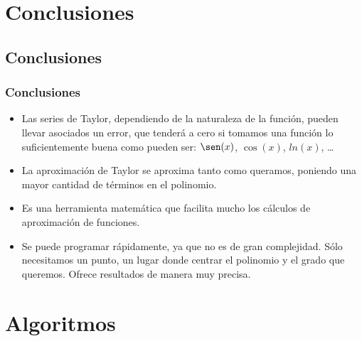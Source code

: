\documentclass{beamer}
\begin{document}
\section{Conclusiones}
\subsection{Conclusiones}
\begin{frame}
\frametitle{Conclusiones}

\begin{itemize}

 \item Las series de Taylor, dependiendo de la naturaleza de la función, pueden llevar asociados un error, que tenderá a cero si tomamos una
 función lo suficientemente buena como pueden ser: $\sen(x)$, $\cos(x)$, $ln(x)$, \ldots
 \item La aproximación de Taylor se aproxima tanto como queramos, poniendo una mayor cantidad de términos en el polinomio.
 \item Es una herramienta matemática que facilita mucho los cálculos de aproximación de funciones.
 \item Se puede programar rápidamente, ya que no es de gran complejidad. Sólo necesitamos un punto, un lugar donde centrar el polinomio y 
el grado que queremos. Ofrece resultados de manera muy precisa.
\end{itemize}
\end{frame}

\section{Algoritmos}
\end{document}
